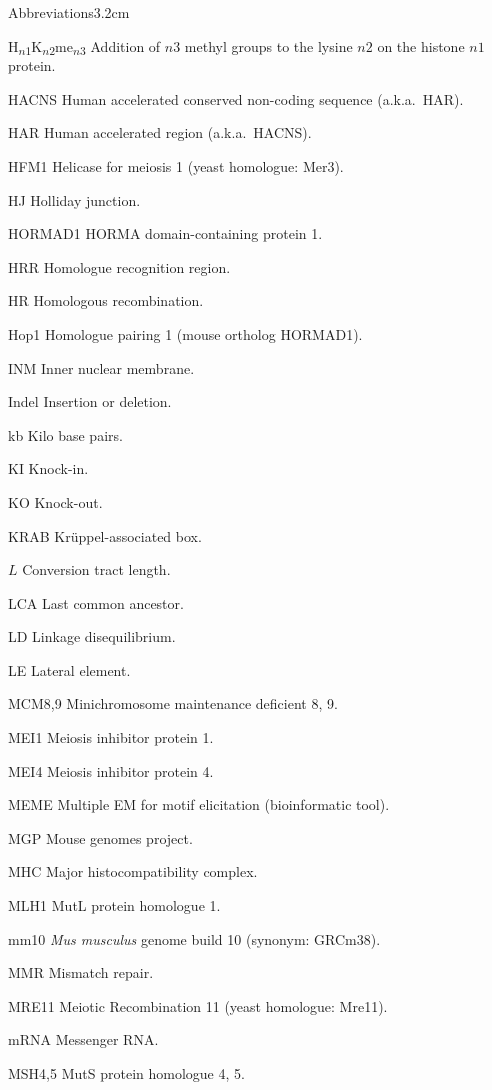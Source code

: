 \begin{mclistof}{Abbreviations}{3.2cm}
\item[H\textsubscript{$n1$}K\textsubscript{$n2$}me\textsubscript{$n3$}] Addition of $n3$ methyl groups to the lysine $n2$ on the histone $n1$ protein.
\item[HACNS] Human accelerated conserved non-coding sequence (a.k.a.\ HAR).
\item[HAR] Human accelerated region (a.k.a.\ HACNS).
\item[HFM1] Helicase for meiosis 1 (yeast homologue: Mer3).
\item[HJ] Holliday junction.
\item[HORMAD1] HORMA domain-containing protein 1.
\item[HRR] Homologue recognition region.
\item[HR] Homologous recombination.
\item[Hop1] Homologue pairing 1 (mouse ortholog HORMAD1).
\item[INM] Inner nuclear membrane.
\item[Indel] Insertion or deletion.
\item[kb] Kilo base pairs.
\item[KI] Knock-in.
\item[KO] Knock-out.
\item[KRAB] Kr\"uppel-associated box.
\item[$L$] Conversion tract length.
\item[LCA] Last common ancestor.
\item[LD] Linkage disequilibrium.
\item[LE] Lateral element.
\item[MCM8,9] Minichromosome maintenance deficient 8, 9.
\item[MEI1] Meiosis inhibitor protein 1.
\item[MEI4] Meiosis inhibitor protein 4.
\item[MEME] Multiple EM for motif elicitation (bioinformatic tool).
\item[MGP] Mouse genomes project.
\item[MHC] Major histocompatibility complex.
\item[MLH1] MutL protein homologue 1.
\item[mm10] \textit{Mus musculus} genome build 10 (synonym: GRCm38).
\item[MMR] Mismatch repair.
\item[MRE11] Meiotic Recombination 11 (yeast homologue: Mre11).
\item[mRNA] Messenger RNA\@.
\item[MSH4,5] MutS protein homologue 4, 5.

\end{mclistof}
